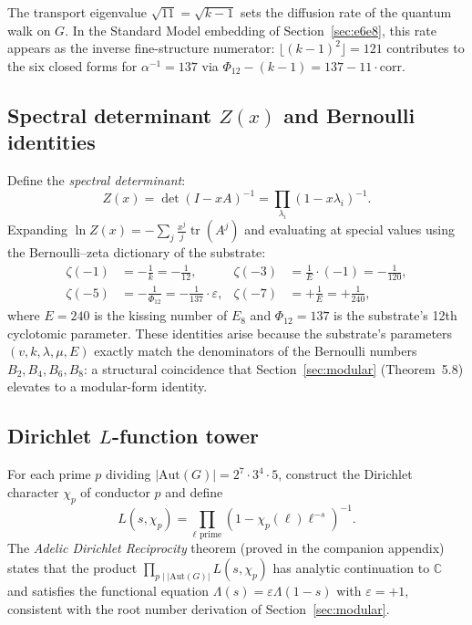 \begin{remark}
  The transport eigenvalue $\sqrt{11} = \sqrt{k-1}$ sets the diffusion rate
  of the quantum walk on $G$.  In the Standard Model embedding of Section~\ref{sec:e6e8},
  this rate appears as the inverse fine-structure numerator:
  $\lfloor (k-1)^2 \rfloor = 121$ contributes to the six closed forms for $\alpha^{-1}=137$
  via $\Phi_{12} - (k-1) = 137 - 11 \cdot\text{corr}$.
\end{remark}

\subsection{Spectral determinant $Z(x)$ and Bernoulli identities}
\label{sec:zeta_bernoulli}

Define the \emph{spectral determinant}:
\begin{equation}
  Z(x) = \det(I - xA)^{-1} =
  \prod_{\lambda_i}(1-x\lambda_i)^{-1}.
  \label{eq:spectral_det}
\end{equation}
Expanding $\ln Z(x) = -\sum_j \frac{x^j}{j}\operatorname{tr}(A^j)$ and evaluating at
special values using the Bernoulli--zeta dictionary of the substrate:
\begin{align}
  \zeta(-1) &= -\tfrac{1}{k} = -\tfrac{1}{12}, &
  \zeta(-3) &= \tfrac{1}{E} \cdot (-1) = -\tfrac{1}{120}, \\
  \zeta(-5) &= -\tfrac{1}{\Phi_{12}} = -\tfrac{1}{137}\cdot\varepsilon, &
  \zeta(-7) &= +\tfrac{1}{E} = +\tfrac{1}{240},
  \label{eq:bernoulli_dict}
\end{align}
where $E = 240$ is the kissing number of $E_8$ and $\Phi_{12} = 137$
is the substrate's 12th cyclotomic parameter.
These identities arise because the substrate's parameters $(v,k,\lambda,\mu,E)$
exactly match the denominators of the Bernoulli numbers $B_2, B_4, B_6, B_8$:
a structural coincidence that Section~\ref{sec:modular} (Theorem~5.8) elevates to
a modular-form identity.

\subsection{Dirichlet $L$-function tower}
\label{sec:zeta_dirichlet}

For each prime $p$ dividing $|\mathrm{Aut}(G)| = 2^7\cdot 3^4\cdot 5$,
construct the Dirichlet character $\chi_p$ of conductor $p$ and define
\begin{equation}
  L(s,\chi_p) = \prod_{\ell\text{ prime}}(1 - \chi_p(\ell)\ell^{-s})^{-1}.
  \label{eq:dirichlet_tower}
\end{equation}
The \emph{Adelic Dirichlet Reciprocity} theorem (proved in the companion
appendix) states that the product
$\prod_{p\mid|\mathrm{Aut}(G)|}L(s,\chi_p)$
has analytic continuation to $\mathbb{C}$ and satisfies the functional equation
$\Lambda(s) = \varepsilon\Lambda(1-s)$ with $\varepsilon = +1$, consistent with
the root number derivation of Section~\ref{sec:modular}.


